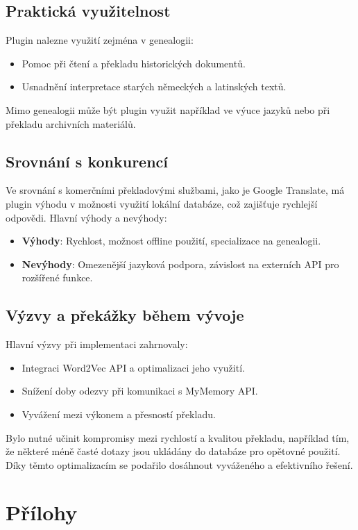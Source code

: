 \documentclass[czech, ba, kiv, he]{fasthesis}
\begin{document}
\section{Praktická využitelnost}
Plugin nalezne využití zejména v genealogii:
\begin{itemize}
    \item Pomoc při čtení a překladu historických dokumentů.
    \item Usnadnění interpretace starých německých a latinských textů.
\end{itemize}
Mimo genealogii může být plugin využit například ve výuce jazyků nebo při překladu archivních materiálů.

\section{Srovnání s konkurencí}
Ve srovnání s komerčními překladovými službami, jako je Google Translate, má plugin výhodu v možnosti využití lokální databáze, což zajišťuje rychlejší odpovědi. Hlavní výhody a nevýhody:
\begin{itemize}
    \item \textbf{Výhody}: Rychlost, možnost offline použití, specializace na genealogii.
    \item \textbf{Nevýhody}: Omezenější jazyková podpora, závislost na externích API pro rozšířené funkce.
\end{itemize}

\section{Výzvy a překážky během vývoje}
Hlavní výzvy při implementaci zahrnovaly:
\begin{itemize}
    \item Integraci Word2Vec API a optimalizaci jeho využití.
    \item Snížení doby odezvy při komunikaci s MyMemory API.
    \item Vyvážení mezi výkonem a přesností překladu.
\end{itemize}
Bylo nutné učinit kompromisy mezi rychlostí a kvalitou překladu, například tím, že některé méně časté dotazy jsou ukládány do databáze pro opětovné použití. Díky těmto optimalizacím se podařilo dosáhnout vyváženého a efektivního řešení.




\appendix


\chapter{Přílohy}
\end{document}
